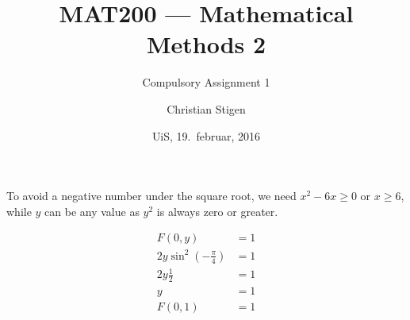 \documentclass[a4paper,norsk,12pt]{article}
\title{MAT200 --- Mathematical Methods 2}
\subtitle{Compulsory Assignment 1}
\author{Christian Stigen}
\date{UiS, 19.~februar, 2016}
\begin{document}
\maketitle

To avoid a negative number under the square root,
we need $x^2 - 6x \ge 0$ or $x \ge 6$, while $y$ can be any value as $y^2$ is
always zero or greater.










\begin{align*}
  F(0,y) &= 1 \\
  2y \sin^2(-\frac{\pi}{4}) &= 1 \\
  2y\frac{1}{2} &= 1 \\
  y &= 1 \\
  F(0,1) &= 1
\end{align*}
\end{document}
